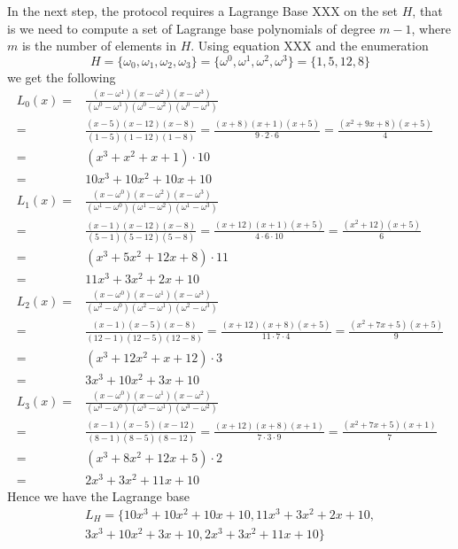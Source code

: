 \begin{example}
In the next step, the protocol requires a Lagrange Base XXX on the set $H$, that is we need to compute a set of Lagrange base polynomials of degree $m-1$, where $m$ is the number of elements in $H$. Using equation XXX and the enumeration 
$$
H= \{\omega_0, \omega_1, \omega_2, \omega_3\} = \{\omega^0,\omega^1,\omega^2,\omega^3\} =  \{1,5,12,8\}
$$
 we get the following
\begin{equation}
\begin{array}{rl}
L_0(x) = &  \frac{(x-\omega^1)(x-\omega^2)(x-\omega^3)}{(\omega^0-\omega^1)(\omega^0-\omega^2)(\omega^0-\omega^3)}\\
       = &  \frac{(x-5)(x-12)(x-8)}{(1-5)(1-12)(1-8)}
       = \frac{(x+8)(x+1)(x+5)}{9\cdot 2\cdot 6}
       = \frac{(x^2 +9x + 8)(x+5)}{4} \\
       = & (x^3 + x^2 +x + 1)\cdot 10 \\
       = & 10x^3 + 10 x^2 +10x + 10\\
L_1(x) = &  \frac{(x-\omega^0)(x-\omega^2)(x-\omega^3)}{(\omega^1-\omega^0)(\omega^1-\omega^2)(\omega^1-\omega^3)}\\
       = &  \frac{(x-1)(x-12)(x-8)}{(5-1)(5-12)(5-8)}
       = \frac{(x+12)(x+1)(x+5)}{4\cdot 6\cdot 10}
       = \frac{(x^2+12)(x+5)}{6} \\
       = & (x^3 +5x^2 +12x + 8)\cdot 11 \\
       = & 11x^3 +3x^2 +2x + 10\\
L_2(x) = &  \frac{(x-\omega^0)(x-\omega^1)(x-\omega^3)}{(\omega^2-\omega^0)(\omega^2-\omega^1)(\omega^2-\omega^3)}\\
       = &  \frac{(x-1)(x-5)(x-8)}{(12-1)(12-5)(12-8)}
       =    \frac{(x+12)(x+8)(x+5)}{11\cdot 7\cdot 4}
       =    \frac{(x^2+7x +5)(x+5)}{9} \\
       = &   (x^3 +12x^2+x + 12)\cdot 3 \\
       = &  3x^3 +10x^2+ 3x + 10\\
L_3(x) = &  \frac{(x-\omega^0)(x-\omega^1)(x-\omega^2)}{(\omega^3-\omega^0)(\omega^3-\omega^1)(\omega^3-\omega^2)}\\
       = &  \frac{(x-1)(x-5)(x-12)}{(8-1)(8-5)(8-12)}
       =   \frac{(x+12)(x+8)(x+1)}{7\cdot 3\cdot 9}
       =   \frac{(x^2 +7x +5)(x+1)}{7} \\
       = &   (x^3 + 8x^2 +12x +5) \cdot 2\\
       = &  2x^3 + 3x^2 +11x +10
\end{array}
\end{equation}
Hence we have the Lagrange base
\begin{multline}
L_H = \{ 10x^3 + 10 x^2 +10x + 10, 11x^3 +3x^2 +2x + 10, \\ 3x^3 +10x^2+ 3x + 10, 2x^3 + 3x^2 +11x +10 \}
\end{multline}


\end{example}
